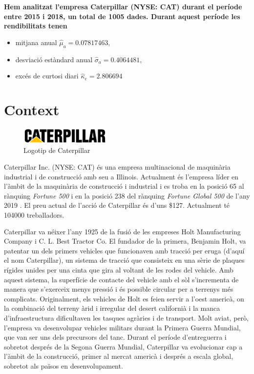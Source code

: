 \documentclass{article}
\numberwithin{table}{section}
\numberwithin{figure}{section}
\numberwithin{equation}{section}
\begin{document}
{\bfseries Hem analitzat l'empresa Caterpillar (NYSE: CAT) durant el període entre 2015 i 2018, un total de 1005 dades. Durant aquest període les rendibilitats tenen
	\begin{itemize}
		\item mitjana anual \( \hat{\mu}_a = \num{0.07817463}\),
		\item desviació estàndard anual \( \hat{\sigma}_a = \num{0.4064481} \),
		\item excés de curtosi diari \( \hat{\kappa}_e = 2.806694 \)
	\end{itemize}
}

\section{Context}
\begin{figure}[H]
	\centering \small \sffamily
	\includegraphics[width=0.4\textwidth]{cat-logo}
	\caption{Logotip de Caterpillar}
\end{figure} 
Caterpillar Inc. (NYSE: CAT) és una empresa multinacional de maquinària industrial i de construcció amb seu a Illinois. Actualment és l'empresa líder en l'àmbit de la maquinària de construcció i industrial \cite{cat} i es troba en la posició 65 al rànquing \emph{Fortune 500} i en la posició 238 del rànquing \emph{Fortune Global 500} de l'any 2019 \cite{fortune,global}. El preu actual de l'acció de Caterpillar és d'uns \$127. Actualment té \num{104000} treballadors. 

Caterpillar va néixer l'any 1925 de la fusió de les empreses Holt Manufacturing Company i C. L. Best Tractor Co. El fundador de la primera, Benjamin Holt, va patentar un dels primers vehicles que funcionaven amb tracció per eruga (d'aquí el nom Caterpillar), un sistema de tracció que consisteix en una sèrie de plaques rígides unides per una cinta que gira al voltant de les rodes del vehicle. Amb aquest sistema, la superfície de contacte del vehicle amb el sòl s'incrementa de manera que s'exerceix menys pressió i és possible circular per a terrenys més complicats. Originalment, els vehicles de Holt es feien servir a l'oest americà, on la combinació del terreny àrid i irregular del desert californià i la manca d'infraestructura dificultaven les tasques agràries i de transport. Molt aviat, però, l'empresa va desenvolupar vehicles militars durant la Primera Guerra Mundial, que van ser uns dels precursors del tanc. Durant el període d'entreguerra i sobretot després de la Segona Guerra Mundial, Caterpillar va evolucionar cap a l'àmbit de la construcció, primer al mercat americà i després a escala global, sobretot als països en desenvolupament. 
\end{document}
